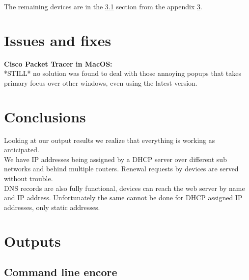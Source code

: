 \documentclass[11pt,a4paper]{report}
\begin{document}
        

        The remaining devices are in the \ref{clioutapxref} section from the appendix \ref{appendixref}.

\chapter{Issues and fixes}
    \textbf{Cisco Packet Tracer in MacOS:}\\
        \hspace*{10mm}*STILL* no solution was found to deal with those annoying popups that takes primary focus over other windows, even using the latest version.\\

\chapter{Conclusions}
    Looking at our output results we realize that everything is working as anticipated.\\
    We have IP addresses being assigned by a DHCP server over different sub networks and behind multiple routers. Renewal requests by devices are served without trouble.\\
    DNS records are also fully functional, devices can reach the web server by name and IP address. Unfortunately the same cannot be done for DHCP assigned IP addresses, only static addresses.

%
%

\appendix
    \chapter{Outputs}
    \label{appendixref}
        \section{Command line encore}
        \label{clioutapxref}
\end{document}
